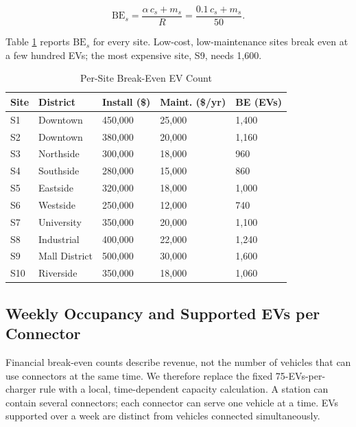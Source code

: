 \documentclass[12pt]{article}
\begin{document}
\begin{equation}
\mathrm{BE}_s = \frac{\alpha\, c_s + m_s}{R} = \frac{0.1\, c_s + m_s}{50}.
\end{equation}

Table \ref{tab:breakeven} reports $\mathrm{BE}_s$ for every site. Low-cost, low-maintenance
sites break even at a few hundred EVs; the most expensive site, S9, needs 1,600.

\begin{table}[H]
\centering
\caption{Per-Site Break-Even EV Count}
\label{tab:breakeven}
\renewcommand{\arraystretch}{0.95}
\begin{tabular}{@{}p{}p{}p{}p{}p{}@{}}
\toprule
Site & District & Install (\$) & Maint. (\$/yr) & BE (EVs) \\
\midrule
S1 & Downtown & 450,000 & 25,000 & 1,400 \\
S2 & Downtown & 380,000 & 20,000 & 1,160 \\
S3 & Northside & 300,000 & 18,000 & 960 \\
S4 & Southside & 280,000 & 15,000 & 860 \\
S5 & Eastside & 320,000 & 18,000 & 1,000 \\
S6 & Westside & 250,000 & 12,000 & 740 \\
S7 & University & 350,000 & 20,000 & 1,100 \\
S8 & Industrial & 400,000 & 22,000 & 1,240 \\
S9 & Mall District & 500,000 & 30,000 & 1,600 \\
S10 & Riverside & 350,000 & 18,000 & 1,060 \\
\bottomrule
\end{tabular}
\end{table}

\subsection{Weekly Occupancy and Supported EVs per Connector}
\label{sec:weeklycapacity}

Financial break-even counts describe revenue, not the number of vehicles that can use
connectors at the same time. We therefore replace the fixed 75-EVs-per-charger rule with
a local, time-dependent capacity calculation. A station can contain several connectors;
each connector can serve one vehicle at a time. EVs supported over a week are distinct
from vehicles connected simultaneously.
\end{document}
